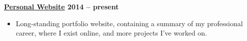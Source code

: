 \textbf{\href{https://jackharrhy.dev/}{Personal Website} \hfill 2014 -- present} \par
\begin{itemize}
	\item Long-standing portfolio website, containing a summary of my professional career, where I exist online, and more projects I've worked on.
\end{itemize}\vspace{0.1cm}\par